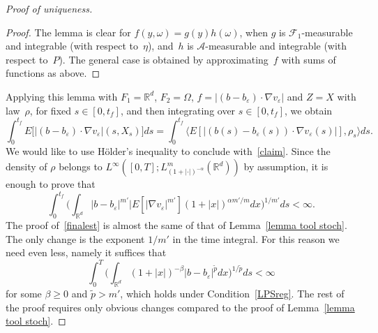 \documentclass[a4paper,10pt]{article}
\newcommand\1{\mathbbm{1}}
\newcommand{\mr}{\mathbb{R}}
\newcommand{\mc}{\mathcal}
\newcommand{\lan}{\langle}
\newcommand{\ran}{\rangle}
\newcommand{\td}{\tilde}
\newcommand{\eps}{\varepsilon}
\numberwithin{equation}{section}
\begin{document}
\begin{proof}[Proof of uniqueness]
\begin{proof}
The lemma is clear for $f(y,\omega)=g(y)h(\omega)$, when $g$ is $\mc{F}_1$-measurable and integrable (with respect to~$\eta$), and~$h$ is $\mc{A}$-measurable and integrable (with respect to~$P$). The general case is obtained by approximating~$f$ with sums of functions as above.
\end{proof}

Applying this lemma with $F_1 = \mr^d$, $F_2 = \Omega$, $f=|(b-b_\eps) \cdot \nabla v_\eps|$ and $Z=X$ with law~$\rho$, for fixed $s \in [0,t_f]$, and then integrating over $s \in [0,t_f]$, we obtain 
\begin{equation*}
 \int^{t_f}_0 E \big[ |(b-b_\eps)\cdot\nabla v_\eps|(s,X_s) \big] ds
 = \int^{t_f}_0 \lan E[|(b(s)-b_\eps(s))\cdot \nabla v_\eps(s)|],\rho_s\ran ds .
\end{equation*}
We would like to use H\"older's inequality to conclude with~\eqref{claim}. Since the density of $\rho$ belongs to $L^\infty([0,T];L^m_{(1+|\cdot|)^{-\alpha}}(\mr^d))$ by assumption, it is enough to prove that
\begin{equation}
\int^{t_f}_0\Big(\int_{\mr^d}|b-b_\eps|^{m'}|E[|\nabla v_\eps|^{m'}](1+|x|)^{\alpha m'/m} dx\Big)^{1/m'}ds < \infty .\label{finalest}
\end{equation}
The proof of~\eqref{finalest} is almost the same of that of Lemma~\ref{lemma tool stoch}. The only change is the exponent $1/m'$ in the time integral. For this reason we need even less, namely it suffices that
\begin{equation*}
\int^T_0 \Big(\int_{\mr^d}(1+|x|)^{-\beta}|b-b_\eps|^{\td{p}}dx\Big)^{1/\td{p}}ds< \infty
\end{equation*}
for some $\beta\ge0$ and $\td{p}>m'$, which holds under Condition~\ref{LPSreg}. The rest of the proof requires only obvious changes compared to the proof of Lemma~\ref{lemma tool stoch}. 
\end{proof}
\end{document}
